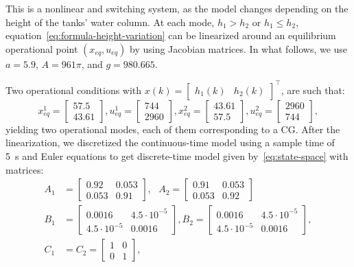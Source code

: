 This is a nonlinear and switching system, as the model changes depending on the
height of the tanks' water column. At each mode, \(h_1>h_2\) or \(h_1\leq h_2\),
equation~\eqref{eq:formula-height-variation} can be linearized around an
equilibrium operational point \((x_{eq},u_{eq})\) by using Jacobian matrices. In
what follows, we use \(a=5.9\), \(A=961\pi{}\), and \(g=980.665\).

Two operational conditions with \(x(k) = \begin{bmatrix}h_1(k) &
	h_2(k)\end{bmatrix}^\top{}\), are such that:
%
\begin{equation*}
	x_{eq}^1 =\! \begin{bmatrix}
		57.5 \\ 43.61
	\end{bmatrix}\!,
	u_{eq}^1 =\! \begin{bmatrix}
		744 \\ 2960
	\end{bmatrix}\!,
	x_{eq}^2 = \begin{bmatrix}
		43.61 \\ 57.5
	\end{bmatrix}\!,
	u_{eq}^2 =\! \begin{bmatrix}
		2960 \\ 744
	\end{bmatrix}\!,
\end{equation*}
yielding two operational modes, each of them corresponding to a CG.\@
%
After the linearization, we discretized the continuous-time model using a sample
time of \SI{5}{\second} and Euler equations to get discrete-time model given
by~\eqref{eq:state-space} with matrices:
%
\begin{align*}
	A_1 & =
	\begin{bmatrix}
		0.92  & 0.053 \\
		0.053 & 0.91
	\end{bmatrix}, ~~~ A_2 = \begin{bmatrix}
		0.91  & 0.053 \\
		0.053 & 0.92
	\end{bmatrix} \\
	B_1 & =
	\begin{bmatrix}
		0.0016          & 4.5\cdot10^{-5} \\
		4.5\cdot10^{-5} & 0.0016
	\end{bmatrix},
	B_2 = \begin{bmatrix}
		0.0016          & 4.5\cdot10^{-5} \\
		4.5\cdot10^{-5} & 0.0016
	\end{bmatrix},                                \\
	C_1 & = C_2 =
	\begin{bmatrix}
		1 & 0 \\
		0 & 1
	\end{bmatrix},
\end{align*}
